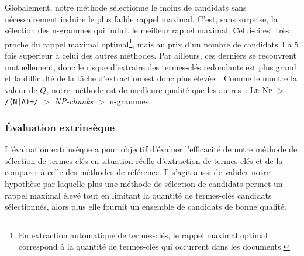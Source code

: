         Globalement, notre méthode sélectionne le moins de
        candidats sans nécessairement induire le plus faible rappel maximal.
        C'est, sans surprise, la sélection des n-grammes qui induit le meilleur
        rappel maximal. Celui-ci est très proche du rappel maximal
        optimal\footnote{En extraction automatique de termes-clés, le rappel
        maximal optimal correspond à la quantité de termes-clés qui occurrent
        dans les documents.}, mais
        au prix d'un nombre de candidats 4 à 5 fois supérieur à celui des autres
        méthodes. Par ailleurs, ces derniers se recouvrent mutuellement, donc le
        risque d'extraire des termes-clés redondants est plus grand et la
        difficulté de la tâche d'extraction est donc plus
        élevée~\cite{hasan2014state_of_the_art}. Comme le montre la valeur de
        $Q$, notre méthode est de meilleure qualité que les autres~:
        \textsc{Lr-Np} $>$ \texttt{/(N|A)+/} $>$ \textit{NP-chunks} $>$
        n-grammes.

      \subsubsection{Évaluation extrinsèque}
      \label{subsubsec:main:domain_independent_keyphrase_extraction-keyphrase_candidate_selection-evaluation-extrinsic_evaluation}
        L'évaluation extrinsèque a pour objectif d'évaluer l'efficacité de notre
        méthode de sélection de termes-clés en situation réelle d'extraction de
        termes-clés et de la comparer à celle des méthodes de référence.
        Il s'agit aussi de valider notre hypothèse par laquelle plus une méthode
        de sélection de candidats permet un rappel maximal élevé tout en
        limitant la quantité de termes-clés candidats sélectionnés, alors plus
        elle fournit un ensemble de candidats de bonne qualité.


